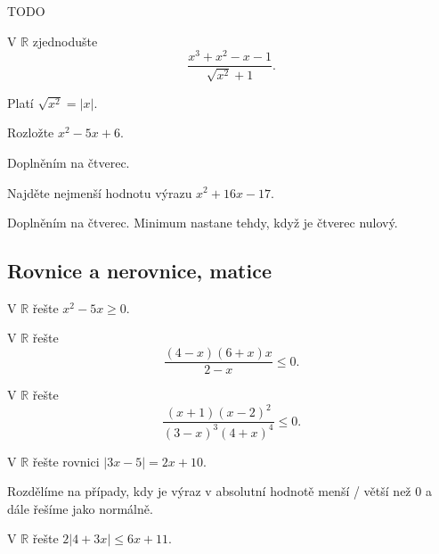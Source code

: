\begin{reseni}
 TODO
\end{reseni}

\begin{priklad}
V $\mathbb R$ zjednodušte
$$\frac{x^3+x^2-x-1}{\sqrt{x^2}+1 }.$$
\end{priklad}

\begin{reseni}
Platí $\sqrt{x^2}=|x| $.
\end{reseni}

\begin{priklad}
Rozložte $x^2-5x+6$.
\end{priklad}

\begin{reseni}
Doplněním na čtverec.
\end{reseni}

\begin{priklad}
Najděte nejmenší hodnotu výrazu $x^2+16x-17.$
\end{priklad}

\begin{reseni}
Doplněním na čtverec. Minimum nastane tehdy, když je čtverec nulový.
\end{reseni}


\subsection{Rovnice a nerovnice, matice}
\begin{priklad}
    V $\mathbb R$ řešte $x^2-5x \geq 0.$
\end{priklad}

\begin{priklad}
V $\mathbb R$ řešte
$$\frac{(4-x)(6+x)x}{2-x}\leq 0.$$
\end{priklad}

\begin{priklad}
V $\mathbb R$ řešte $$\frac{(x+1)(x-2)^2}{(3-x)^3(4+x)^4}\leq 0.$$
\end{priklad}

\begin{priklad}
V $\mathbb R$ řešte rovnici $|3x-5|=2x+10.$
\end{priklad}

\begin{priklad}
Rozdělíme na případy, kdy je výraz v absolutní hodnotě menší / větší než 0
a dále řešíme jako normálně.
\end{priklad}

\begin{priklad}
V $\mathbb R$ řešte $2|4+3x|\leq 6x+11.$
\end{priklad}

